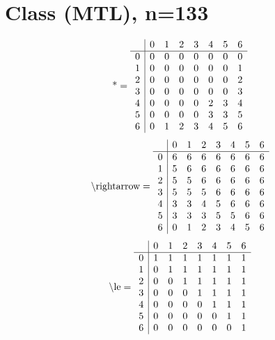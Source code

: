 \documentclass[11pt]{article}
\begin{document}
\section{Class (MTL), n=133}
\[\text{*} = 
\begin{array}{r | r r r r r r r}
 & 0 & 1 & 2 & 3 & 4 & 5 & 6 \\ \hline
0 & 0 & 0 & 0 & 0 & 0 & 0 & 0 \\
1 & 0 & 0 & 0 & 0 & 0 & 0 & 1 \\
2 & 0 & 0 & 0 & 0 & 0 & 0 & 2 \\
3 & 0 & 0 & 0 & 0 & 0 & 0 & 3 \\
4 & 0 & 0 & 0 & 0 & 2 & 3 & 4 \\
5 & 0 & 0 & 0 & 0 & 3 & 3 & 5 \\
6 & 0 & 1 & 2 & 3 & 4 & 5 & 6 \\
\end{array}
\]
\[\text{\textbackslash rightarrow} = 
\begin{array}{r | r r r r r r r}
 & 0 & 1 & 2 & 3 & 4 & 5 & 6 \\ \hline
0 & 6 & 6 & 6 & 6 & 6 & 6 & 6 \\
1 & 5 & 6 & 6 & 6 & 6 & 6 & 6 \\
2 & 5 & 5 & 6 & 6 & 6 & 6 & 6 \\
3 & 5 & 5 & 5 & 6 & 6 & 6 & 6 \\
4 & 3 & 3 & 4 & 5 & 6 & 6 & 6 \\
5 & 3 & 3 & 3 & 5 & 5 & 6 & 6 \\
6 & 0 & 1 & 2 & 3 & 4 & 5 & 6 \\
\end{array}
\]
\[\text{\textbackslash le} = 
\begin{array}{r | r r r r r r r}
 & 0 & 1 & 2 & 3 & 4 & 5 & 6 \\ \hline
0 & 1 & 1 & 1 & 1 & 1 & 1 & 1 \\
1 & 0 & 1 & 1 & 1 & 1 & 1 & 1 \\
2 & 0 & 0 & 1 & 1 & 1 & 1 & 1 \\
3 & 0 & 0 & 0 & 1 & 1 & 1 & 1 \\
4 & 0 & 0 & 0 & 0 & 1 & 1 & 1 \\
5 & 0 & 0 & 0 & 0 & 0 & 1 & 1 \\
6 & 0 & 0 & 0 & 0 & 0 & 0 & 1 \\
\end{array}
\]
\end{document}
